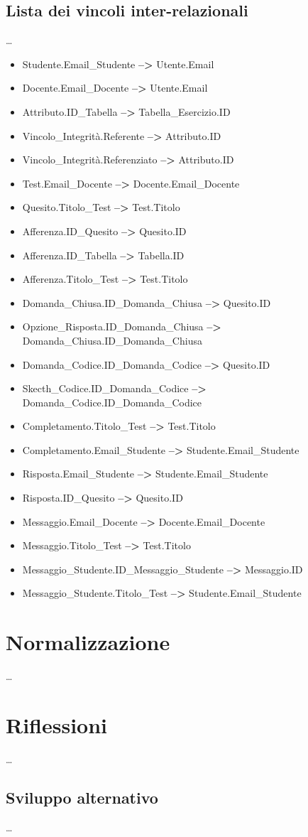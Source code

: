 \documentclass{article}
\begin{document}
\subsection{Lista dei vincoli inter-relazionali}
\large
\dots
\begin{itemize}[label={ }, leftmargin=*, wide=1pt]
    \itemsep0em
    \item Studente.Email\_Studente \textbf{-->} Utente.Email
    \item Docente.Email\_Docente \textbf{-->} Utente.Email
    \item Attributo.ID\_Tabella \textbf{-->} Tabella\_Esercizio.ID
    \item Vincolo\_Integrità.Referente \textbf{-->} Attributo.ID
    \item Vincolo\_Integrità.Referenziato \textbf{-->} Attributo.ID
    \item Test.Email\_Docente \textbf{-->} Docente.Email\_Docente
    \item Quesito.Titolo\_Test \textbf{-->} Test.Titolo
    \item Afferenza.ID\_Quesito \textbf{-->} Quesito.ID
    \item Afferenza.ID\_Tabella \textbf{-->} Tabella.ID
    \item Afferenza.Titolo\_Test \textbf{-->} Test.Titolo
    \item Domanda\_Chiusa.ID\_Domanda\_Chiusa \textbf{-->} Quesito.ID
    \item Opzione\_Risposta.ID\_Domanda\_Chiusa \textbf{-->} Domanda\_Chiusa.ID\_Domanda\_Chiusa 
    \item Domanda\_Codice.ID\_Domanda\_Codice \textbf{-->} Quesito.ID
    \item Skecth\_Codice.ID\_Domanda\_Codice \textbf{-->} Domanda\_Codice.ID\_Domanda\_Codice
    \item Completamento.Titolo\_Test \textbf{-->} Test.Titolo
    \item Completamento.Email\_Studente \textbf{-->} Studente.Email\_Studente
    \item Risposta.Email\_Studente \textbf{-->} Studente.Email\_Studente
    \item Risposta.ID\_Quesito \textbf{-->} Quesito.ID
    \item Messaggio.Email\_Docente \textbf{-->} Docente.Email\_Docente
    \item Messaggio.Titolo\_Test \textbf{-->} Test.Titolo
    \item Messaggio\_Studente.ID\_Messaggio\_Studente \textbf{-->} Messaggio.ID
    \item Messaggio\_Studente.Titolo\_Test \textbf{-->} Studente.Email\_Studente
\end{itemize}


\newpage
\section{Normalizzazione}
\large
\dots

\section{Riflessioni}
\large
\dots

\subsection{Sviluppo alternativo}
\large
\dots
\end{document}
